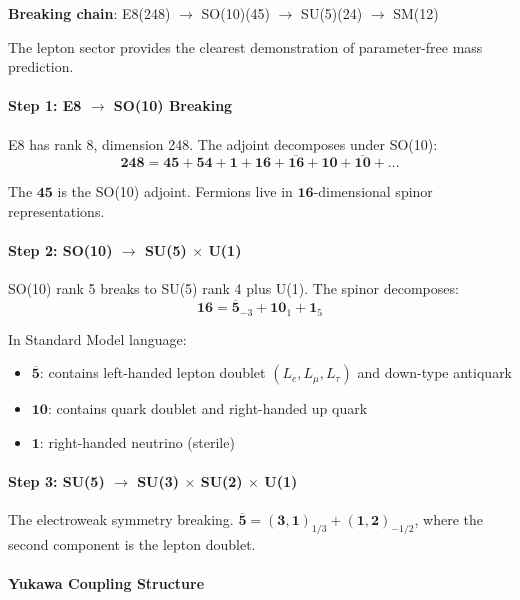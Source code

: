\documentclass[12pt,a4paper]{article}
\begin{document}
\textbf{Breaking chain}: E8(248) $\to$ SO(10)(45) $\to$ SU(5)(24) $\to$ SM(12)

The lepton sector provides the clearest demonstration of parameter-free mass prediction.

\paragraph{Step 1: E8 $\to$ SO(10) Breaking}

E8 has rank 8, dimension 248. The adjoint decomposes under SO(10):
\begin{equation}
\mathbf{248} = \mathbf{45} + \mathbf{54} + \mathbf{1} + \mathbf{16} + \mathbf{\overline{16}} + \mathbf{10} + \mathbf{\overline{10}} + \ldots
\end{equation}

The $\mathbf{45}$ is the SO(10) adjoint. Fermions live in $\mathbf{16}$-dimensional spinor representations.

\paragraph{Step 2: SO(10) $\to$ SU(5) $\times$ U(1)}

SO(10) rank 5 breaks to SU(5) rank 4 plus U(1). The spinor decomposes:
\begin{equation}
\mathbf{16} = \mathbf{\overline{5}}_{-3} + \mathbf{10}_{1} + \mathbf{1}_{5}
\end{equation}

In Standard Model language:
\begin{itemize}
\item $\mathbf{\overline{5}}$: contains left-handed lepton doublet $(L_e, L_\mu, L_\tau)$ and down-type antiquark
\item $\mathbf{10}$: contains quark doublet and right-handed up quark
\item $\mathbf{1}$: right-handed neutrino (sterile)
\end{itemize}

\paragraph{Step 3: SU(5) $\to$ SU(3) $\times$ SU(2) $\times$ U(1)}

The electroweak symmetry breaking. $\mathbf{\overline{5}} = (\mathbf{3}, \mathbf{1})_{1/3} + (\mathbf{1}, \mathbf{2})_{-1/2}$, where the second component is the lepton doublet.

\paragraph{Yukawa Coupling Structure}
\end{document}

